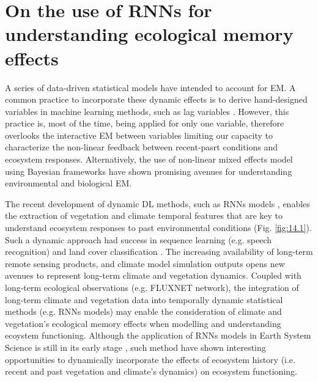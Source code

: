 \section{On the use of RNNs for understanding ecological memory effects}
    
    A series of data-driven statistical models have intended to account for EM. A common practice to incorporate these dynamic effects is to derive hand-designed variables in machine learning methods, such as lag variables \citep{CR12,CR13}. However, this practice is, most of the time, being applied for only one variable, therefore overlooks the interactive EM between variables \citep{CR14} limiting our capacity to characterize the non-linear feedback between recent-pasrt conditions and ecosystem responses.  Alternatively, the use of non-linear mixed effects model using Bayesian frameworks \citep{CR17,CR2} have shown promising avenues for understanding environmental and biological EM. 

    The recent development of dynamic DL methods, such as RNNs models \citep{CR19,CR20}, enables the extraction of vegetation and climate temporal features that are key to understand ecosystem responses to past environmental conditions (Fig. \ref{fig:14.1}). Such a dynamic approach had success in sequence learning (e.g. speech recognition) and land cover classification \citep{CR21}. The increasing availability of long-term remote sensing products, and climate model simulation outputs opens new avenues to represent long-term climate and vegetation dynamics. Coupled with long‐term ecological observations (e.g. FLUXNET network), the integration of long-term climate and vegetation data into temporally dynamic statistical methods (e.g. RNNs models) may enable the consideration of climate and vegetation's ecological memory effects when modelling and understanding ecoystem functioning. Although the application of RNNs models in Earth System Science is still in its early stage \citep{CR22,CR23,CR24}, such method have shown interesting opportunities to dynamically incorporate the effects of ecosystem history (i.e. recent and past vegetation and climate's dynamics) on ecosystem functioning.     

